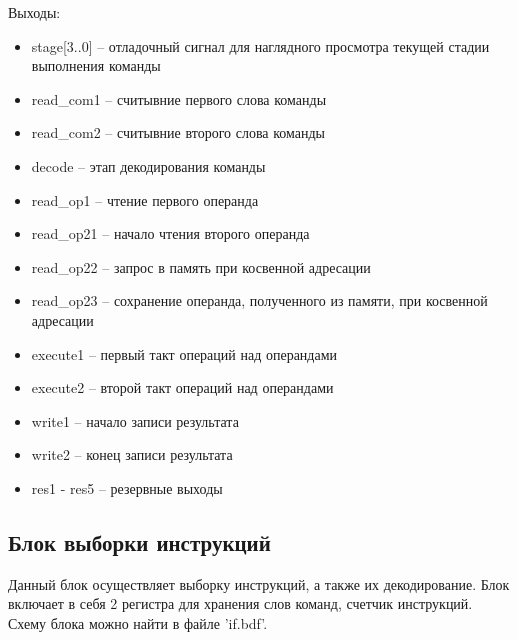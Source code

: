 Выходы:
\begin{itemize}
    \item stage[3..0] -- отладочный сигнал для наглядного просмотра текущей стадии выполнения команды
    \item read\_com1 -- считывние первого слова команды
    \item read\_com2 -- считывние второго слова команды
    \item decode -- этап декодирования команды
    \item read\_op1 -- чтение первого операнда
    \item read\_op21 -- начало чтения второго операнда
    \item read\_op22 -- запрос в память при косвенной адресации
    \item read\_op23 -- сохранение операнда, полученного из памяти, при косвенной адресации
    \item execute1 -- первый такт операций над операндами
    \item execute2 -- второй такт операций над операндами
    \item write1 -- начало записи результата
    \item write2 -- конец записи результата
    \item res1 - res5 -- резервные выходы
\end{itemize}
\subsection{Блок выборки инструкций}
Данный блок осуществляет выборку инструкций, а также их декодирование.
Блок включает в себя 2 регистра для хранения слов команд, счетчик инструкций.
Схему блока можно найти в файле 'if.bdf'.

